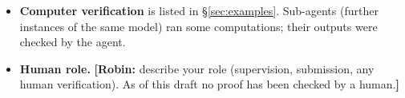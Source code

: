 \documentclass[submission]{FPSAC2027}
\theoremstyle{definition}
\theoremstyle{remark}
\newcommand{\robin}[1]{{\color{blue}\textbf{[Robin:} #1\textbf{]}}}
\newcommand{\LG}{\mathrm{LG}}
\newcommand{\OG}{\mathrm{OG}}
\begin{document}
\begin{itemize}
Claude-based, run independently), line-read and endorsed the inductive proof of
Theorem~\ref{thm:window} on $\LG$ and $\OG$ and the support-only vanishing argument of
Remark~\ref{rem:Z}, and independently checked Theorem~\ref{thm:window} for $m\le6$ and the
$p=1$ Pieri values on $1243$ shapes. Theorem~\ref{thm:main}, the recursion~\eqref{eq:star},
Theorem~\ref{thm:HZ}, Corollary~\ref{cor:OC} and the half-step operator have \emph{not} been
line-read by anyone other than the agent.
\item \textbf{Computer verification} is listed in \S\ref{sec:examples}. Sub-agents (further
instances of the same model) ran some computations; their outputs were checked by the agent.
\item \textbf{Human role.} \robin{describe your role (supervision, submission, any human verification). As of this draft no proof has been checked by a human.}
\end{itemize}
\end{document}
